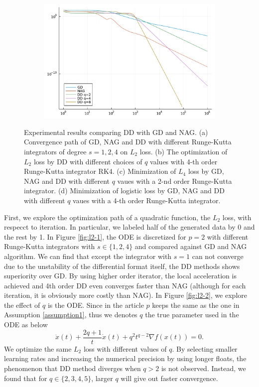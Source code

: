 \begin{figure}[htbp]
\begin{subfigure}{0.45\textwidth}
        \caption{}
        \label{l4}
    \end{subfigure}
    \hfill
    \begin{subfigure}{0.45\textwidth}
        \includegraphics[width=\textwidth]{"assets/logistic.pdf"}
        \caption{}
        \label{fig:logistic}
    \end{subfigure}
    \caption{Experimental results comparing DD with GD and NAG. (a) Convergence path of GD, NAG and DD with different Runge-Kutta integrators of degree $s=1, 2, 4$ on $L_2$ loss. (b) The optimization of $L_2$ loss by DD with different choices of $q$ values with 4-th order Runge-Kutta integrator RK4. (c) Minimization of $L_4$ loss by GD, NAG and DD with different $q$ vaues with a 2-nd order Runge-Kutta integrator. (d) Minimization of logistic loss by GD, NAG and DD with different $q$ vaues with a 4-th order Runge-Kutta integrator.}
    \label{Numerical}
\end{figure}

First, we explore the optimization path of a quadratic function, the $L_2$ loss, with respecct to iteration. In particular, we labeled half of the generated data by 0 and the rest by 1. In Figure \ref{fig:l2-1}, the ODE is discretized for $p=2$ with different Runge-Kutta integrators with $s \in \{ 1,2,4 \}$ and compared against GD and NAG algorithm. We can find that except the integrator with $s=1$ can not converge due to the unstability of the differential format itself, the DD methods shows superiority over GD. By using higher order iterator, the local acceleration is achieved and 4th order DD even converges faster than NAG (although for each iteration, it is obviously more costly than NAG). In Figure \ref{fig:l2-2}, we explore the effect of $q$ is the ODE. Since in the article $p$ keeps the same as the one in Assumption \ref{assumption1}, thus we denotes $q$ the true parameter used in the ODE as below
$$
    \ddot x(t) + \frac{2q+1}{t}\dot x(t)+q^2 t^{q-2}\nabla  f(x(t)) = 0.
$$
We optimize the same $L_2$ loss with different values of $q$. By selecting smaller learning rates and increasing the numerical precision by using longer floats, the phenomenon that DD method diverges when $q>2$ is not observed. Instead, we found that for $q \in \{ 2,3,4,5 \}$, larger $q$ will give out faster convergence.

